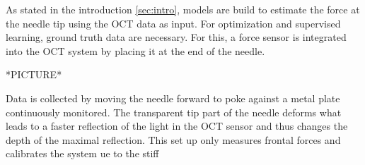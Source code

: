 

As stated in the introduction \ref{sec:intro}, models are build to estimate the force at the needle tip 
using the OCT data as input.
For optimization and supervised learning, ground truth data are necessary. For this, a force sensor is 
integrated into the OCT system by placing it at the end of the needle.

*PICTURE*

Data is collected by moving the needle forward to poke against a metal plate continuously monitored.
The transparent tip part of the needle deforms what leads to a faster reflection of the light in the OCT sensor and thus
changes the depth of the maximal reflection.
This set up only measures frontal forces and calibrates the system ue to the stiff 

